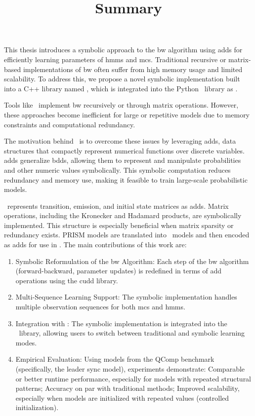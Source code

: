 \documentclass[a4paper,10pt]{article}
\title{Summary}
\date{}
\begin{document}
\maketitle
\thispagestyle{empty}
\noindent
This thesis introduces a symbolic approach to the \gls{bw} algorithm using \glspl{add} for efficiently learning parameters of \glspl{hmm} and \glspl{mc}.
Traditional recursive or matrix-based implementations of \gls{bw} often suffer from high memory usage and limited scalability.
To address this, we propose a novel symbolic implementation built into a C++ library named \Cupaal, which is integrated into the Python \Jajapy\ library as \JajapyTwo.


Tools like \Jajapy\ implement \gls{bw} recursively or through matrix operations.
However, these approaches become inefficient for large or repetitive models due to memory constraints and computational redundancy.

The motivation behind \Cupaal\ is to overcome these issues by leveraging \glspl{add}, data structures that compactly represent numerical functions over discrete variables.
\glspl{add} generalize \glspl{bdd}, allowing them to represent and manipulate probabilities and other numeric values symbolically.
This symbolic computation reduces redundancy and memory use, making it feasible to train large-scale probabilistic models.

\Cupaal\ represents transition, emission, and initial state matrices as \glspl{add}.
Matrix operations, including the Kronecker and Hadamard products, are symbolically implemented.
This structure is especially beneficial when matrix sparsity or redundancy exists.
PRISM models are translated into \Jajapy\ models and then encoded as \glspl{add} for use in \Cupaal.
The main contributions of this work are:


\begin{enumerate}
    \item Symbolic Reformulation of the \gls{bw} Algorithm: Each step of the \gls{bw} algorithm (forward-backward, parameter updates) is redefined in terms of \gls{add} operations using the \gls{cudd} library.
    \item Multi-Sequence Learning Support: The symbolic implementation handles multiple observation sequences for both \glspl{mc} and \glspl{hmm}.
    \item Integration with \Jajapy: The symbolic implementation is integrated into the \Jajapy\ library, allowing users to switch between traditional and symbolic learning modes.
    \item Empirical Evaluation: Using models from the QComp benchmark (specifically, the leader sync model), experiments demonstrate: Comparable or better runtime performance, especially for models with repeated structural patterns; Accuracy on par with traditional methods; Improved scalability, especially when models are initialized with repeated values (controlled initialization).
\end{enumerate}
\end{document}
